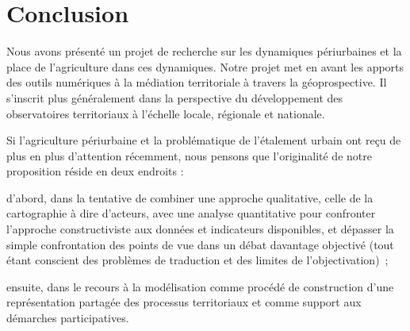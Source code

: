 \section
{Conclusion}

Nous avons présenté un projet de recherche sur les dynamiques périurbaines et
la place de l’agriculture dans ces dynamiques.
Notre projet met en avant les apports des outils numériques à la médiation
territoriale à travers la géoprospective. Il s'inscrit plus généralement dans
la perspective du développement des observatoires territoriaux à l’échelle
locale, régionale et nationale.

Si l’agriculture périurbaine et
la problématique de l’étalement urbain ont reçu de plus en plus d’attention
récemment, nous pensons que l’originalité de notre proposition réside en deux
endroits :

\startitemize

\item d’abord, dans la tentative de combiner une approche qualitative, celle de la
cartographie à dire d’acteurs, avec une analyse quantitative pour confronter
l’approche constructiviste aux données et indicateurs disponibles, et dépasser
la simple confrontation des points de vue dans un débat davantage objectivé
(tout étant conscient des problèmes de traduction et des limites de
l’objectivation) ;

\item ensuite, dans le recours à la modélisation comme procédé de construction d’une
représentation partagée des processus territoriaux et comme support aux
démarches participatives.

\stopitemize


